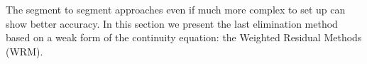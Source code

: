   The segment to segment approaches even if much more complex to set up can show better accuracy. In this section we present the last elimination method based on a weak form of the continuity equation: the Weighted Residual Methods (WRM).

